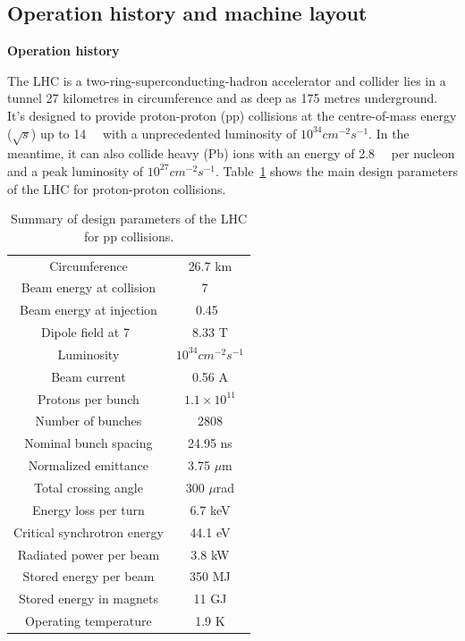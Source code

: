 \subsection{Operation history and machine layout}

\textbf{Operation history}

The LHC \cite{Bruning:2004ej, Buning:2004wk, Benedikt:2004wm, Evans_2008} 
is a two-ring-superconducting-hadron accelerator and collider lies in a tunnel 27 kilometres in circumference and as deep as 175 metres underground.
It's designed to provide proton-proton (pp) collisions at the centre-of-mass energy ($\sqrt{s}$) up to 14~\tev~
with a unprecedented luminosity of $10^{34} cm^{-2} s^{-1}$.
In the meantime, it can also collide heavy (Pb) ions with an energy of 2.8~\tev~ per nucleon and a peak luminosity of $10^{27} cm^{-2} s^{-1}$.
Table~\ref{tab:LHC_parameters} shows the main design parameters of the LHC for proton-proton collisions.
\begin{table}[htbp]
  \centering
  \caption{Summary of design parameters of the LHC for pp collisions.}
  \label{tab:LHC_parameters}
  \begin{tabular}{cc}
    \hline
    Circumference	& 26.7 km\\
    Beam energy at collision	& 7 ~\tev\\
    Beam energy at injection	& 0.45~\tev \\
    Dipole field at 7~\tev	& 8.33 T \\
    Luminosity		& $10^{34} cm^{-2} s^{-1}$ \\
    Beam current	& 0.56 A \\
    Protons per bunch	& $1.1 \times 10^{11}$ \\
    Number of bunches	& 2808 \\
    Nominal bunch spacing	& 24.95 ns \\
    Normalized emittance	& 3.75 $\mu$m \\
    Total crossing angle	& 300 $\mu$rad \\
    Energy loss per turn	& 6.7 keV \\
    Critical synchrotron energy	& 44.1 eV \\
    Radiated power per beam	& 3.8 kW \\
    Stored energy per beam	& 350 MJ \\
    Stored energy in magnets	& 11 GJ \\
    Operating temperature	& 1.9 K \\
    \hline
  \end{tabular}
\end{table}

